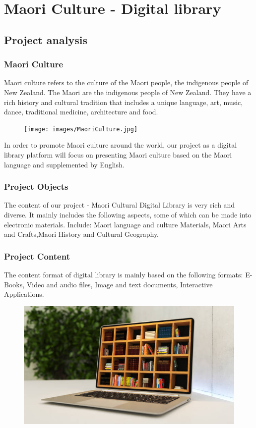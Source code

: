 \chapter{Maori Culture - Digital library}

\section{Project analysis}
\subsection{Maori Culture}
Maori culture refers to the culture of the Maori people, the indigenous people of New Zealand. The Maori are the indigenous people of New Zealand. They have a rich history and cultural tradition that includes a unique language, art, music, dance, traditional medicine, architecture and food.

\begin{figure}[htbp]
  \centerline{\texttt{[image: images/MaoriCulture.jpg]}}
\end{figure}

In order to promote Maori culture around the world, our project as a digital library platform will focus on presenting Maori culture based on the Maori language and supplemented by English.

\subsection{Project Objects}
The content of our project - Maori Cultural Digital Library is very rich and diverse. It mainly includes the following aspects, some of which can be made into electronic materials. Include: Maori language and culture Materials, Maori Arts and Crafts,Maori History and Cultural Geography.

\subsection{Project Content}
The content format of digital library is mainly based on the following formats:
E-Books, Video and audio files, Image and text documents, Interactive Applications.

\begin{figure}[htbp]
  \centerline{\includegraphics[width=500pt]{images/digitallibrary.jpg}}
\end{figure}

